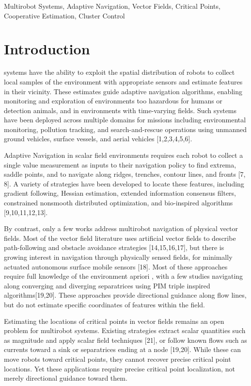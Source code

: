 \documentclass[lettersize,journal]{IEEEtran}
\begin{document}
\begin{IEEEkeywords}
Multirobot Systems, Adaptive Navigation, Vector Fields, Critical Points, Cooperative Estimation, Cluster Control
\end{IEEEkeywords}



\section{Introduction}

 systems have the ability to exploit the spatial distribution of robots to collect local samples of the environment with appropriate sensors and estimate features in their vicinity. These estimates guide adaptive navigation algorithms, enabling monitoring and exploration of environments too hazardous for humans or detection animals, and in environments with time-varying fields. Such systems have been deployed across multiple domains for missions including environmental monitoring, pollution tracking, and search-and-rescue operations using unmanned ground vehicles, surface vessels, and aerial vehicles [1,2,3,4,5,6].

Adaptive Navigation in scalar field environments requires each robot to collect a single value measurement as inputs to their navigation policy to find extrema, saddle points, and to navigate along ridges, trenches, contour lines, and fronts [7, 8]. A variety of strategies have been developed to locate these features, including gradient following, Hessian estimation, extended information consensus filters, constrained nonsmooth distributed optimization, and bio-inspired algorithms [9,10,11,12,13].

By contrast, only a few works address multirobot navigation of physical vector fields. Most of the vector field literature uses artificial vector fields to describe path-following and obstacle avoidance strategies [14,15,16,17], but there is growing interest in navigation through physically sensed fields, for minimally actuated autonomous surface mobile sensors [18]. Most of these approaches require full knowledge of the environment apriori , with a few studies navigating along converging and diverging separatrices using PIM triple inspired algorithms[19,20]. These approaches provide directional guidance along flow lines, but do not estimate specific coordinates of features within the field.

Estimating the locations of critical points in vector fields remains an open problem for multirobot systems. Existing strategies extract scalar quantities such as magnitude and apply scalar field techniques [21], or follow known flows such as currents toward a sink or separatrices ending at a node [19,20]. While these can move robots toward critical points, they cannot recover precise critical point locations. Yet these applications require precise critical point localization, not merely directional guidance toward them.
\end{document}
